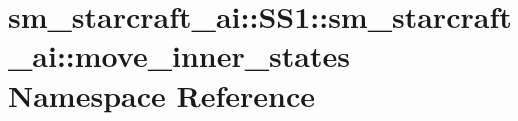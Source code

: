 \hypertarget{namespacesm__starcraft__ai_1_1SS1_1_1sm__starcraft__ai_1_1move__inner__states}{}\section{sm\+\_\+starcraft\+\_\+ai\+:\+:S\+S1\+:\+:sm\+\_\+starcraft\+\_\+ai\+:\+:move\+\_\+inner\+\_\+states Namespace Reference}
\label{namespacesm__starcraft__ai_1_1SS1_1_1sm__starcraft__ai_1_1move__inner__states}
